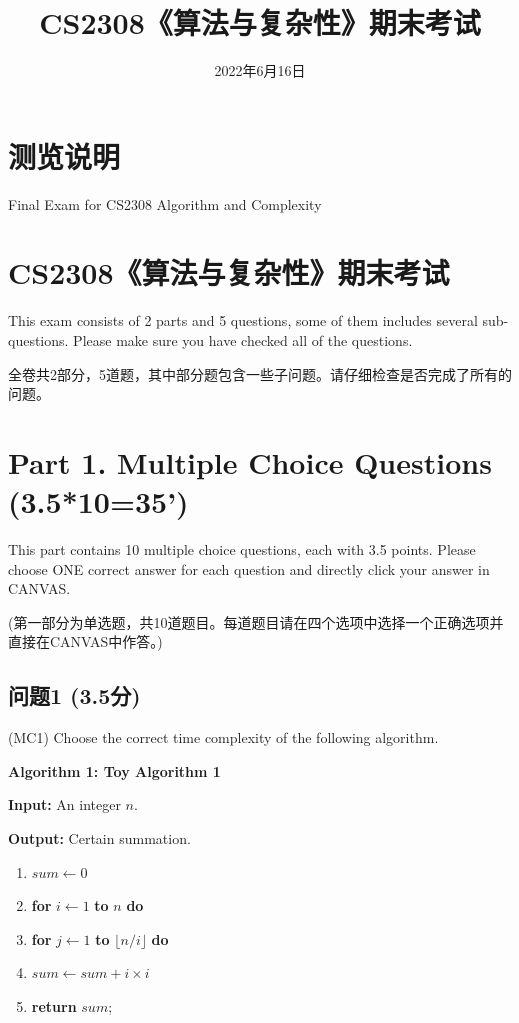 \documentclass[11pt, a4paper]{article}
\title{CS2308《算法与复杂性》期末考试}
\author{}
\date{2022年6月16日}
\begin{document}
\maketitle

\section*{测览说明}
Final Exam for CS2308 Algorithm and Complexity

\section*{CS2308《算法与复杂性》期末考试}
This exam consists of 2 parts and 5 questions, some of them includes several sub-questions. Please make sure you have checked all of the questions.

全卷共2部分，5道题，其中部分题包含一些子问题。请仔细检查是否完成了所有的问题。

\section*{Part 1. Multiple Choice Questions (3.5*10=35')}
This part contains 10 multiple choice questions, each with 3.5 points. Please choose ONE correct answer for each question and directly click your answer in CANVAS.

(第一部分为单选题，共10道题目。每道题目请在四个选项中选择一个正确选项并直接在CANVAS中作答。)

\subsection*{问题1 (3.5分)}
(MC1) Choose the correct time complexity of the following algorithm.

\textbf{Algorithm 1: Toy Algorithm 1}

\textbf{Input:} An integer \(n\).

\textbf{Output:} Certain summation.

\begin{enumerate}[label=\arabic*., leftmargin=*]
    \item \(sum \leftarrow 0\)
    \item \textbf{for} \(i \leftarrow 1\) \textbf{to} \(n\) \textbf{do}
    \item \hspace{1em} \textbf{for} \(j \leftarrow 1\) \textbf{to} \(\lfloor n / i \rfloor\) \textbf{do}
    \item \hspace{2em} \(sum \leftarrow sum + i \times i\)
    \item \textbf{return} \(sum\);
\end{enumerate}
\end{document}
